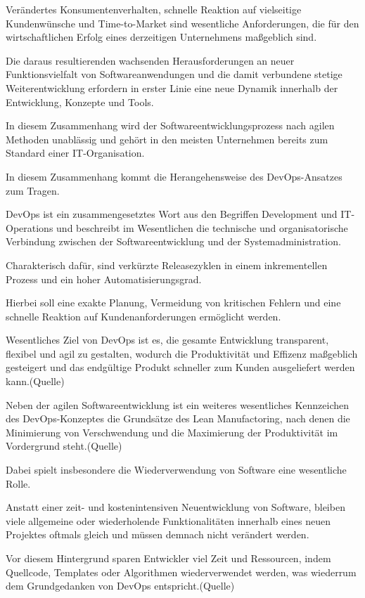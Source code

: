 Verändertes Konsumentenverhalten, schnelle Reaktion auf vielseitige Kundenwünsche und Time-to-Market sind wesentliche Anforderungen, die für den wirtschaftlichen Erfolg eines derzeitigen Unternehmens maßgeblich sind.

Die daraus resultierenden wachsenden Herausforderungen an neuer Funktionsvielfalt von Softwareanwendungen und die damit verbundene stetige Weiterentwicklung erfordern in erster Linie eine neue Dynamik innerhalb der Entwicklung, Konzepte und Tools. 

In diesem Zusammenhang wird der Softwareentwicklungsprozess nach agilen Methoden unablässig und gehört in den meisten Unternehmen bereits zum Standard einer IT-Organisation. 

In diesem Zusammenhang kommt die Herangehensweise des DevOps-Ansatzes zum Tragen.

DevOps ist ein zusammengesetztes Wort aus den Begriffen Development und IT-Operations und beschreibt im Wesentlichen die technische und organisatorische Verbindung zwischen der Softwareentwicklung und der Systemadministration.

Charakterisch dafür, sind verkürzte Releasezyklen in einem inkrementellen Prozess und ein hoher Automatisierungsgrad. 

Hierbei soll eine exakte Planung, Vermeidung von kritischen Fehlern und eine schnelle Reaktion auf Kundenanforderungen ermöglicht werden.

Wesentliches Ziel von DevOps ist es, die gesamte Entwicklung transparent, flexibel und agil zu gestalten, wodurch die Produktivität und Effizenz maßgeblich gesteigert und das endgültige Produkt schneller zum Kunden ausgeliefert werden kann.(Quelle)  

Neben der agilen Softwareentwicklung ist ein weiteres wesentliches Kennzeichen des DevOps-Konzeptes die Grundsätze des Lean Manufactoring, nach denen die Minimierung von Verschwendung und die Maximierung der Produktivität im Vordergrund steht.(Quelle) 

Dabei spielt insbesondere die Wiederverwendung von Software eine wesentliche Rolle.

Anstatt einer zeit- und kostenintensiven Neuentwicklung von Software, bleiben viele allgemeine oder wiederholende Funktionalitäten innerhalb eines neuen Projektes oftmals gleich und müssen demnach nicht verändert werden.

Vor diesem Hintergrund sparen Entwickler viel Zeit und Ressourcen, indem Quellcode, Templates oder Algorithmen wiederverwendet werden, was wiederrum dem Grundgedanken von DevOps entspricht.(Quelle) 

